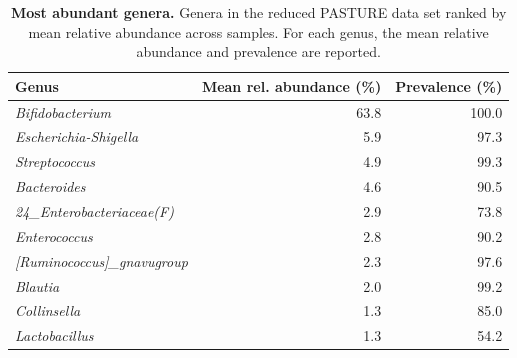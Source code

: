 \begin{table}

\caption{\label{tab:unnamed-chunk-7}\textbf{Most abundant genera.} Genera in the reduced PASTURE data set ranked by mean relative abundance across samples. For each genus, the mean relative abundance and prevalence are reported.}
\centering
\begin{tabular}[t]{lrr}
\toprule
Genus & Mean rel. abundance (\%) & Prevalence (\%)\\
\midrule
\emph{Bifidobacterium} & 63.8 & 100.0\\
\emph{Escherichia-Shigella} & 5.9 & 97.3\\
\emph{Streptococcus} & 4.9 & 99.3\\
\emph{Bacteroides} & 4.6 & 90.5\\
\emph{24_Enterobacteriaceae(F)} & 2.9 & 73.8\\
\addlinespace
\emph{Enterococcus} & 2.8 & 90.2\\
\emph{[Ruminococcus]_gnavugroup} & 2.3 & 97.6\\
\emph{Blautia} & 2.0 & 99.2\\
\emph{Collinsella} & 1.3 & 85.0\\
\emph{Lactobacillus} & 1.3 & 54.2\\
\bottomrule
\end{tabular}
\end{table}

